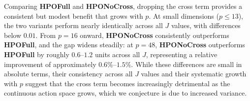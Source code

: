 \documentclass{article}
\theoremstyle{definition}
\theoremstyle{remark}
\begin{document}
Comparing \textbf{HPOFull} and \textbf{HPONoCross}, dropping the cross term provides a consistent but 
modest benefit that grows with $p$. At small dimensions ($p \leq 13$), the two variants 
perform nearly identically across all $J$ values, with differences below $0.01$. From 
$p = 16$ onward, \textbf{HPONoCross} consistently outperforms \textbf{HPOFull}, and the gap widens 
steadily: at $p = 48$, \textbf{HPONoCross} outperforms \textbf{HPOFull} by roughly $0.6$--$1.2$ units 
across all $J$, representing a relative improvement of approximately $0.6\%$--$1.5\%$. 
While these differences are small in absolute terms, their consistency across all $J$ 
values and their systematic growth with $p$ suggest that the cross term becomes 
increasingly detrimental as the continuous action space grows, which we conjecture is 
due to increased variance.
\end{document}
